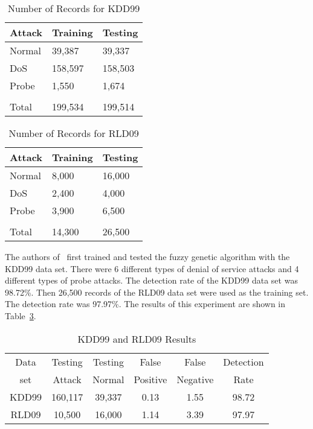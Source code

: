 \documentclass{sig-alternate}
\begin{document}
\begin{table}
\caption{Number of Records for KDD99}
\begin{tabular}{|lll|} \hline
Attack & Training & Testing\\ \hline
Normal & 39,387 & 39,337\\
DoS & 158,597 & 158,503\\
Probe & 1,550 & 1,674\\
 & &\\
 Total & 199,534 & 199,514\\
\hline\end{tabular}
\label{tab:RecordsForKDD99}
\end{table}


\begin{table}
\caption{Number of Records for RLD09}
\begin{tabular}{|lll|} \hline
Attack & Training & Testing\\ \hline
Normal & 8,000 & 16,000\\
DoS & 2,400 & 4,000\\
Probe & 3,900 & 6,500\\
 & &\\
 Total & 14,300 & 26,500\\
\hline\end{tabular}
\label{tab:RecordsForRLD09}
\end{table}

The authors of~\cite{6496342, 6559603} first trained and tested the fuzzy genetic algorithm with the KDD99 data set. There were 6 different types of denial of service attacks and 4 different types of probe attacks. The detection rate of the KDD99 data set was 98.72\%. Then 26,500 records of the RLD09 data set were used as the training set. The detection rate was 97.97\%. The results of this experiment are shown in Table~\ref{tab:bothSetsResults}.

\begin{table}
\caption{KDD99 and RLD09 Results}
\begin{tabular}{|cccccc|} \hline
Data & Testing & Testing & False    & False    & Detection\\
set  & Attack  & Normal  & Positive & Negative & Rate\\ \hline
KDD99 & 160,117 & 39,337 & 0.13 & 1.55 & 98.72\\
RLD09 & 10,500 & 16,000 & 1.14 & 3.39 & 97.97\\
\hline\end{tabular}
\label{tab:bothSetsResults}
\end{table}
\end{document}
